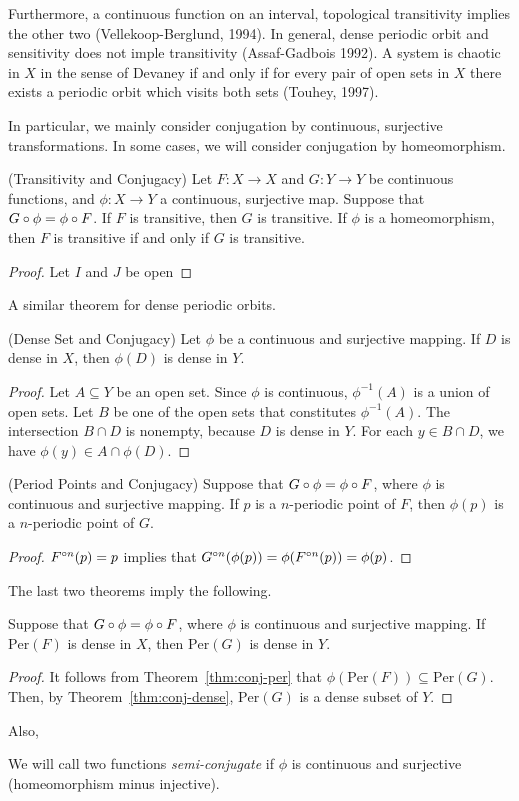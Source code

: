\documentclass[12pt,draft,twoside]{article}
\begin{document}
Furthermore, a continuous function on an interval, topological transitivity implies the other two (Vellekoop-Berglund, 1994).
In general, dense periodic orbit and sensitivity does not imple transitivity (Assaf-Gadbois 1992).
A system is chaotic in $X$ in the sense of Devaney if and only if for every pair of open sets in $X$ there exists a periodic orbit which visits both sets (Touhey, 1997).

In particular, we mainly consider conjugation by continuous, surjective transformations.
In some cases, we will consider conjugation by homeomorphism.
\begin{theorem}
  (Transitivity and Conjugacy) 
  Let $F: X \to X$ and $G: Y \to Y$ be continuous functions, and $\phi: X \to Y$ a continuous, surjective map.
  Suppose that $G \circ \phi = \phi \circ F$.
  If $F$ is transitive, then $G$ is transitive.
  If $\phi$ is a homeomorphism, then $F$ is transitive if and only if $G$ is transitive.
  \begin{proof}
    Let $I$ and $J$ be open 
    \end{proof}
\end{theorem}
A similar theorem for dense periodic orbits.
\begin{theorem}
  (Dense Set and Conjugacy) 
  Let $\phi$ be a continuous and surjective mapping.
  If $D$ is dense in $X$, then $\phi(D)$ is dense in $Y$.
  \label{thm:conj-dense}
  \begin{proof}
    Let $A \subseteq Y$ be an open set.
    Since $\phi$ is continuous, $\phi^{-1} (A)$ is a union of open sets.
    Let $B$ be one of the open sets that constitutes $\phi^{-1}(A)$.
    The intersection $B \cap D$ is nonempty, because $D$ is dense in $Y$.
    For each $y \in B \cap D$, we have $\phi(y) \in A \cap \phi(D)$.
  \end{proof}
\end{theorem}
\begin{theorem}
  (Period Points and Conjugacy)
  Suppose that $G \circ \phi = \phi \circ F$, where $\phi$ is continuous and surjective mapping.
  If $p$ is a $n$-periodic point of $F$, then $\phi(p)$ is a $n$-periodic point of $G$.
  \label{thm:conj-per}
  \begin{proof}
    $F^{\circ n}(p) = p$ implies that $G^{\circ n}(\phi(p)) = \phi(F^{\circ n}(p)) = \phi(p)$.
  \end{proof}
\end{theorem}
The last two theorems imply the following.
\begin{theorem}
  Suppose that $G \circ \phi = \phi \circ F$, where $\phi$ is continuous and surjective mapping.
  If $\mathrm{Per}(F)$ is dense in $X$, then $\mathrm{Per}(G)$ is dense in $Y$.
  \label{thm:conj-dense-per}
  \begin{proof}
    It follows from Theorem~\ref{thm:conj-per} that $\phi(\mathrm{Per}(F)) \subseteq \mathrm{Per}(G)$.
    Then, by Theorem~\ref{thm:conj-dense}, $\mathrm{Per}(G)$ is a dense subset of $Y$.
  \end{proof}
\end{theorem}
Also,
\begin{theorem}
  
  \label{thm:conj-sdic}
\end{theorem}

We will call two functions \textit{semi-conjugate} if $\phi$ is continuous and surjective (homeomorphism minus injective).




\printindex
\end{document}
